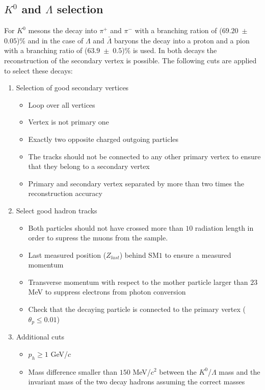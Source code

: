 \subsection{$K^0$ and $\Lambda$ selection}

For $K^0$ mesons the decay into $\pi^+$ and $\pi^-$ with a branching ration of ($69.20$~$\pm$~$0.05$)\% \cite{PDG} and in the case of $\Lambda$ and $\bar{\Lambda}$ baryons the decay into a proton and a pion with a branching ratio of ($63.9$~$\pm$~$0.5$)\% \cite{PDG} is used. In both decays the reconstruction of the secondary vertex is possible. The following cuts are applied to select these decays:

\begin{enumerate}
  \item Selection of good secondary vertices
  \begin{itemize}
    \item Loop over all vertices
    \item Vertex is not primary one
    \item Exactly two opposite charged outgoing particles
    \item The tracks should not be connected to any other primary vertex to ensure that they belong to a secondary vertex
    \item Primary and secondary vertex separated by more than two times the reconstruction accuracy
  \end{itemize}
  \item Select good hadron tracks
  \begin{itemize}
    \item Both particles should not have crossed more than $10$ radiation length in order to supress the muons from the sample.
    \item Last measured position ($Z_{last}$) behind SM$1$ to ensure a measured momentum
    \item Transverse momentum with respect to the mother particle larger than $23$ MeV to suppress electrons from photon conversion
    \item Check that the decaying particle is connected to the primary vertex ($\theta_p \le 0.01$)
  \end{itemize}
  \item Additional cuts
  \begin{itemize}
    \item $p_h \geq 1$ GeV/$c$
    \item Mass difference smaller than $150$ MeV/$c^2$ between the $K^0$/$\Lambda$ mass and the invariant mass of the two decay hadrons assuming the correct masses
  \end{itemize}
\end{enumerate}


